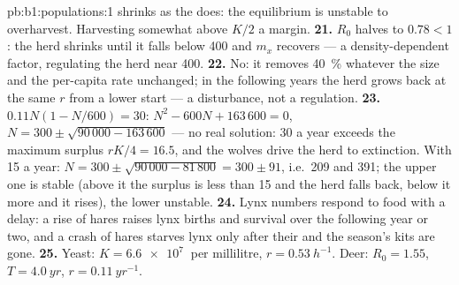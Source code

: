 \begin{solution}{pb:b1:populations:1}
shrinks as the  does: the equilibrium is unstable to
overharvest. Harvesting somewhat above $K/2$  a margin.
\textbf{21.} $R_0$ halves to $0.78 < 1$: the herd shrinks until it
falls below 400 and $m_x$ recovers --- a density-dependent factor,
regulating the herd near 400.
\textbf{22.} No: it removes \qty{40}{\%} whatever the size and 
the per-capita rate unchanged; in the following years the herd grows
back at the same $r$ from a lower start --- a disturbance, not a
regulation.
\textbf{23.} $0.11N(1 - N/600) = 30$: $N^2 - 600N + 163\,600 = 0$,
$N = 300\pm\sqrt{90\,000 - 163\,600}$ --- no real solution: 30 a year
exceeds the maximum surplus $rK/4 = 16.5$, and the wolves drive the
herd to extinction. With 15 a year: $N = 300\pm\sqrt{90\,000 -
81\,800} = 300\pm 91$, i.e.\ 209 and 391; the upper one is stable
(above it the surplus is less than 15 and the herd falls back, below
it more and it rises), the lower unstable.
\textbf{24.} Lynx numbers respond to food with a delay: a rise of hares
raises lynx births and survival over the following year or two, and a
crash of hares starves lynx only after their  and the season's
kits are gone.
\textbf{25.} Yeast: $K = \qty{6.6e7}{}$  per millilitre, $r =
\qty{0.53}{h^{-1}}$. Deer: $R_0 = 1.55$, $T = \qty{4.0}{yr}$, $r =
\qty{0.11}{yr^{-1}}$.
\end{solution}
